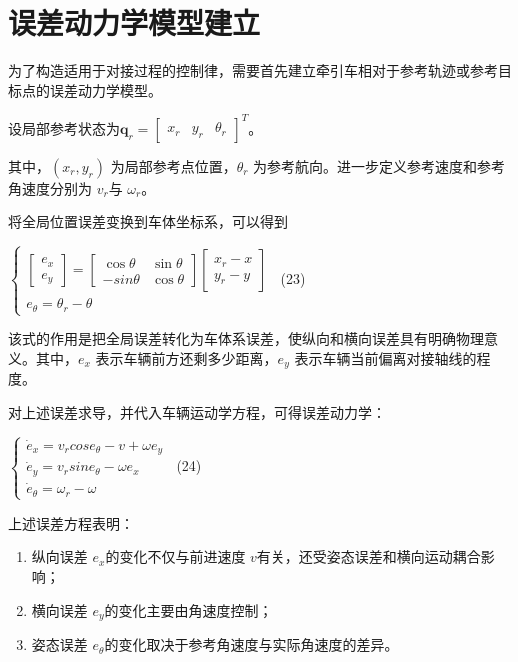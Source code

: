 \section{误差动力学模型建立}

为了构造适用于对接过程的控制律，需要首先建立牵引车相对于参考轨迹或参考目标点的误差动力学模型。

设局部参考状态为\(\mathbf{q}_{r} = \begin{bmatrix}
x_{r} & y_{r} & \theta_{r}
\end{bmatrix}^{T}\)。

其中，\(\left( x_{r},y_{r} \right)\) 为局部参考点位置，\(\theta_{r}\)
为参考航向。进一步定义参考速度和参考角速度分别为 \(v_{r}\)与
\(\omega_{r}\)。

将全局位置误差变换到车体坐标系，可以得到

\(\left\{ \begin{array}{r}
\left\lbrack \begin{array}{r}
e_{x} \\
e_{y}
\end{array} \right\rbrack = \begin{bmatrix}
\cos\theta & \sin\theta \\
 - sin\theta & \cos\theta
\end{bmatrix}\left\lbrack \begin{array}{r}
x_{r} - x \\
y_{r} - y
\end{array} \right\rbrack \\
e_{\theta} = \theta_{r} - \theta
\end{array} \right.\ \) (23)

该式的作用是把全局误差转化为车体系误差，使纵向和横向误差具有明确物理意义。其中，\(e_{x}\)
表示车辆前方还剩多少距离，\(e_{y}\) 表示车辆当前偏离对接轴线的程度。

对上述误差求导，并代入车辆运动学方程，可得误差动力学：

\(\left\{ \begin{array}{r}
{\dot{e}}_{x} = v_{r}cose_{\theta} - v + \omega e_{y} \\
{\dot{e}}_{y} = v_{r}sine_{\theta} - \omega e_{x} \\
{\dot{e}}_{\theta} = \omega_{r} - \omega
\end{array} \right.\ \) (24)

上述误差方程表明：

\begin{enumerate}
\def\labelenumi{\arabic{enumi}.}
\item
  纵向误差 \(e_{x}\)的变化不仅与前进速度
  \(v\)有关，还受姿态误差和横向运动耦合影响；
\item
  横向误差 \(e_{y}\)的变化主要由角速度控制；
\item
  姿态误差 \(e_{\theta}\)的变化取决于参考角速度与实际角速度的差异。
\end{enumerate}

